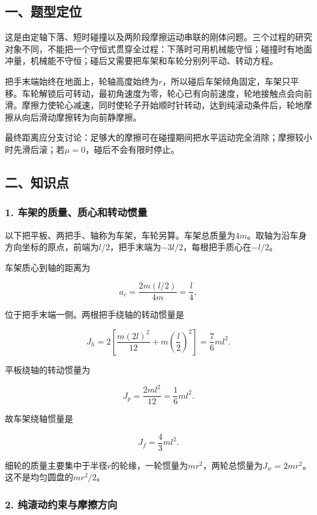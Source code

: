 \documentclass[12pt,a4paper,fontset=fandol]{ctexart}
\begin{document}
\subsection{一、题型定位}\label{ux4e00ux9898ux578bux5b9aux4f4d-1}

这是由定轴下落、短时碰撞以及两阶段摩擦运动串联的刚体问题。三个过程的研究对象不同，不能把一个守恒式贯穿全过程：下落时可用机械能守恒；碰撞时有地面冲量，机械能不守恒；碰后又需要把车架和车轮分别列平动、转动方程。

把手末端始终在地面上，轮轴高度始终为\(r\)，所以碰后车架倾角固定，车架只平移。车轮解锁后可转动，最初角速度为零，轮心已有向前速度，轮地接触点会向前滑。摩擦力使轮心减速，同时使轮子开始顺时针转动，达到纯滚动条件后，轮地摩擦从向后滑动摩擦转为向前静摩擦。

最终距离应分支讨论：足够大的摩擦可在碰撞期间把水平运动完全消除；摩擦较小时先滑后滚；若\(\mu=0\)，碰后不会有限时停止。

\subsection{二、知识点}\label{ux4e8cux77e5ux8bc6ux70b9-1}

\subsubsection{1.
车架的质量、质心和转动惯量}\label{ux8f66ux67b6ux7684ux8d28ux91cfux8d28ux5fc3ux548cux8f6cux52a8ux60efux91cf}

以下把平板、两把手、轴称为车架，车轮另算。车架总质量为\(4m\)。取轴为沿车身方向坐标的原点，前端为\(l/2\)，把手末端为\(-3l/2\)，每根把手质心在\(-l/2\)。

车架质心到轴的距离为

\[
a_c=\frac{2m(l/2)}{4m}=\frac l4,
\]

位于把手末端一侧。两根把手绕轴的转动惯量是

\[
J_h=2\left[\frac{m(2l)^2}{12}+m\left(\frac l2\right)^2\right]
=\frac76ml^2.
\]

平板绕轴的转动惯量为

\[
J_p=\frac{2ml^2}{12}=\frac16ml^2.
\]

故车架绕轴惯量是

\[
\boxed{J_f=\frac43ml^2}.
\]

细轮的质量主要集中于半径\(r\)的轮缘，一轮惯量为\(mr^2\)，两轮总惯量为\(J_w=2mr^2\)。这不是均匀圆盘的\(m r^2/2\)。

\subsubsection{2.
纯滚动约束与摩擦方向}\label{ux7eafux6edaux52a8ux7ea6ux675fux4e0eux6469ux64e6ux65b9ux5411}
\end{document}
